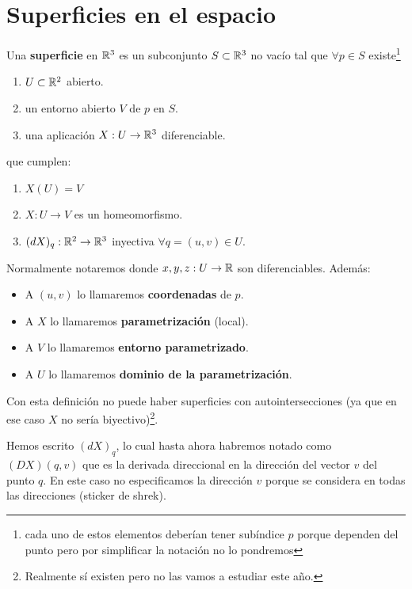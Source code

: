 \chapter{Superficies en el espacio}

\begin{definicion}
    Una \textbf{superficie} en $\mathbb{R}^3$ es un subconjunto $S\subset \mathbb{R}^3$ no vacío tal que $\forall p \in S$ existe\footnote{cada uno de estos elementos deberían tener subíndice $p$ porque dependen del punto pero por simplificar la notación no lo pondremos}
    \begin{enumerate}
        \item $U\subset \mathbb{R}^2$ abierto.
        \item un entorno abierto $V$ de $p$ en $S$.
        \item una aplicación $X:U \to \mathbb{R}^3$ diferenciable.
    \end{enumerate}
    que cumplen:
    \begin{enumerate}
        \item $X(U)=V$
        \item $X:U\to V$ es un homeomorfismo.
        \item $(dX)_q : \mathbb{R}^2 \to \mathbb{R}^3$ inyectiva $\forall q=(u,v) \in U$.
    \end{enumerate}
    Normalmente notaremos
    donde $x,y,z:U\to \mathbb{R}$ son diferenciables. Además:
    \begin{itemize}  
            \item A $(u,v)$ lo llamaremos \textbf{coordenadas} de $p$.
            \item A $X$ lo llamaremos \textbf{parametrización} (local).
            \item A $V$ lo llamaremos \textbf{entorno parametrizado}.
            \item A $U$ lo llamaremos \textbf{dominio de la parametrización}.
        \end{itemize}
\end{definicion}

\begin{observacion}
    Con esta definición no puede haber superficies con autointersecciones (ya que en ese caso $X$ no sería biyectivo)\footnote{Realmente sí existen pero no las vamos a estudiar este año.}.
\end{observacion}

\begin{notacion}
    Hemos escrito $(dX)_q$, lo cual hasta ahora habremos notado como $(DX)(q,v)$ que es la derivada direccional en la dirección del vector $v$ del punto $q$. En este caso no especificamos la dirección $v$ porque se considera en todas las direcciones (sticker de shrek).
\end{notacion}

